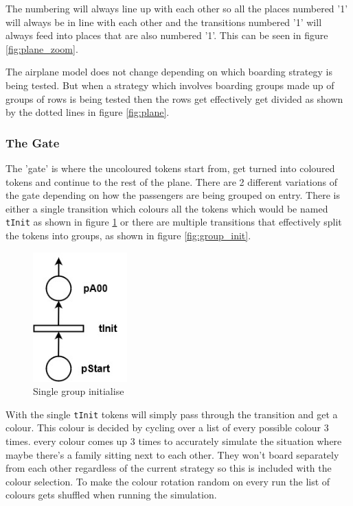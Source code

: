 \documentclass[english]{article}
\begin{document}
The numbering will always line up with each other so all the places numbered '1' will always be in line with each other and the transitions numbered '1' will always feed into places that are also numbered '1'. This can be seen in figure \ref{fig:plane_zoom}.

The airplane model does not change depending on which boarding strategy is being tested. But when a strategy which involves boarding groups made up of groups of rows is being tested then the rows get effectively get divided as shown by the dotted lines in figure \ref{fig:plane}.

\subsubsection{The Gate}
The 'gate' is where the uncoloured tokens start from, get turned into coloured tokens and continue to the rest of the plane. There are 2 different variations of the gate depending on how the passengers are being grouped on entry. There is either a single transition which colours all the tokens which would be named \lstinline{tInit} as shown in figure \ref{fig:basic_init} or there are multiple transitions that effectively split the tokens into groups, as shown in figure \ref{fig:group_init}.

\begin{figure}[H]
    \centering
    \includegraphics[height=5cm]{figures/basic_init.jpg}
    \caption{Single group initialise}
    \label{fig:basic_init}
\end{figure}

With the single \lstinline{tInit} tokens will simply pass through the transition and get a colour. This colour is decided by cycling over a list of every possible colour 3 times. every colour comes up 3 times to accurately simulate the situation where maybe there's a family sitting next to each other. They won't board separately from each other regardless of the current strategy so this is included with the colour selection. To make the colour rotation random on every run the list of colours gets shuffled when running the simulation.
\end{document}
